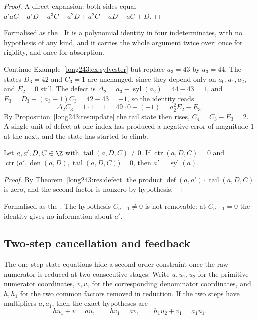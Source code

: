 \documentclass[11pt]{article}
\newcommand{\sylnext}{\operatorname{syl}}
\newcommand{\den}{\operatorname{den}}
\newcommand{\tail}{\operatorname{tail}}
\newcommand{\ctr}{\operatorname{ctr}}
\newcommand{\defect}{\operatorname{def}}
\begin{document}
\begin{proof}
A direct expansion: both sides equal
$a'aC-a'D-a^{3}C+a^{2}D+a^{2}C-aD-aC+D$.
\end{proof}

\noindent Formalised as the
.  It is a polynomial identity in four indeterminates, with no
hypothesis of any kind, and it carries the whole argument twice over: once for
rigidity, and once for absorption.

\begin{example}\label{long243:ex:defect}
Continue Example~\ref{long243:ex:sylvester} but replace $a_3=43$ by $a_3=44$.  The
states $D_3=42$ and $C_3=1$ are unchanged, since they depend only on
$a_0,a_1,a_2$, and $E_2=0$ still.  The defect is
$\Delta_2=a_3-\sylnext(a_2)=44-43=1$, and
$E_3=D_3-(a_3-1)C_3=42-43=-1$, so the identity reads
\[
 \Delta_2C_3=1\cdot1=1=49\cdot0-(-1)=a_2^{2}E_2-E_3 .
\]
By Proposition~\ref{long243:res:update} the tail state then rises, $C_4=C_3-E_3=2$.  A
single unit of defect at one index has produced a negative error of magnitude
$1$ at the next, and the state has started to climb.
\end{example}

\begin{theorem}\label{long243:res:step}
Let $a,a',D,C\in\Z$ with $\tail(a,D,C)\ne0$.  If
$\ctr(a,D,C)=0$ and $\ctr\bigl(a',\den(a,D),\tail(a,D,C)\bigr)=0$, then
$a'=\sylnext(a)$.
\end{theorem}

\begin{proof}
By Theorem~\ref{long243:res:defect} the product $\defect(a,a')\cdot\tail(a,D,C)$ is
zero, and the second factor is nonzero by hypothesis.
\end{proof}

\noindent Formalised as the
.  The hypothesis $C_{n+1}\ne0$ is not removable: at $C_{n+1}=0$
the identity gives no information about $a'$.

\subsection{Two-step cancellation and feedback}

The one-step state equations hide a second-order constraint once the raw
numerator is reduced at two consecutive stages.  Write $u,u_1,u_2$ for the
primitive numerator coordinates, $v,v_1$ for the corresponding denominator
coordinates, and $h,h_1$ for the two common factors removed in reduction.  If
the two steps have multipliers $a,a_1$, then the exact hypotheses are
\[
 hu_1+v=au,\qquad hv_1=av,\qquad
 h_1u_2+v_1=a_1u_1.
\]
\end{document}
